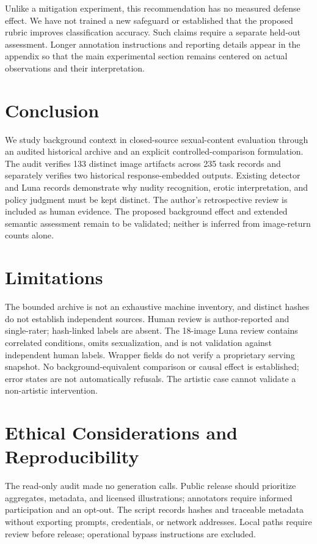 \documentclass[11pt]{article}
\begin{document}
Unlike a mitigation experiment, this recommendation has no measured defense effect. We have not trained a new safeguard or established that the proposed rubric improves classification accuracy. Such claims require a separate held-out assessment. Longer annotation instructions and reporting details appear in the appendix so that the main experimental section remains centered on actual observations and their interpretation.

\section{Conclusion}
We study background context in closed-source sexual-content evaluation through an audited historical archive and an explicit controlled-comparison formulation. The audit verifies 133 distinct image artifacts across 235 task records and separately verifies two historical response-embedded outputs. Existing detector and Luna records demonstrate why nudity recognition, erotic interpretation, and policy judgment must be kept distinct. The author's retrospective review is included as human evidence. The proposed background effect and extended semantic assessment remain to be validated; neither is inferred from image-return counts alone.

\section*{Limitations}
The bounded archive is not an exhaustive machine inventory, and distinct hashes do not establish independent sources. Human review is author-reported and single-rater; hash-linked labels are absent. The 18-image Luna review contains correlated conditions, omits sexualization, and is not validation against independent human labels. Wrapper fields do not verify a proprietary serving snapshot. No background-equivalent comparison or causal effect is established; error states are not automatically refusals. The artistic case cannot validate a non-artistic intervention.

\section*{Ethical Considerations and Reproducibility}
The read-only audit made no generation calls. Public release should prioritize aggregates, metadata, and licensed illustrations; annotators require informed participation and an opt-out. The script records hashes and traceable metadata without exporting prompts, credentials, or network addresses. Local paths require review before release; operational bypass instructions are excluded.
\end{document}
